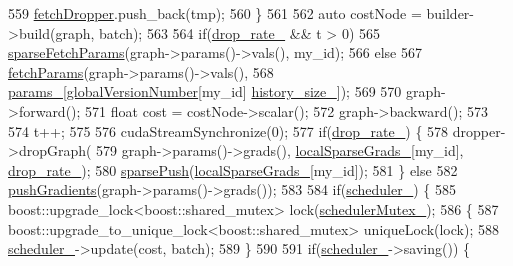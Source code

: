 \begin{DoxyCode}
559         \hyperlink{classmarian_1_1AsyncGraphGroup_a67f02023b00ba1a67e1f8894dbb7123a}{fetchDropper}.push\_back(tmp);
560       \}
561 
562       \textcolor{keyword}{auto} costNode = builder->build(graph, batch);
563 
564       \textcolor{keywordflow}{if}(\hyperlink{classmarian_1_1AsyncGraphGroup_a774969ba69bab8fbd48e6454bbe7e54c}{drop\_rate\_} && t > 0)
565         \hyperlink{classmarian_1_1AsyncGraphGroup_af104a4373fad7cc8f274423107c58d17}{sparseFetchParams}(graph->params()->vals(), my\_id);
566       \textcolor{keywordflow}{else}
567         \hyperlink{classmarian_1_1AsyncGraphGroup_aeec1695ae7d7ac0f819242ad0c8af55d}{fetchParams}(graph->params()->vals(),
568                     \hyperlink{classmarian_1_1AsyncGraphGroup_ad1bf15e55cc12b90d39012303b14767b}{params\_}[\hyperlink{classmarian_1_1AsyncGraphGroup_a75884703e6fe8efb3c75293eb912bce4}{globalVersionNumber}[my\_id] %
      \hyperlink{classmarian_1_1AsyncGraphGroup_a0958c1384fc7486dd4f739d69c9ac636}{history\_size\_}]);
569 
570       graph->forward();
571       \textcolor{keywordtype}{float} cost = costNode->scalar();
572       graph->backward();
573 
574       t++;
575 
576       cudaStreamSynchronize(0);
577       \textcolor{keywordflow}{if}(\hyperlink{classmarian_1_1AsyncGraphGroup_a774969ba69bab8fbd48e6454bbe7e54c}{drop\_rate\_}) \{
578         dropper->dropGraph(
579             graph->params()->grads(), \hyperlink{classmarian_1_1AsyncGraphGroup_a29422f1a8b9a8e2cc732101a34557b61}{localSparseGrads\_}[my\_id], 
      \hyperlink{classmarian_1_1AsyncGraphGroup_a774969ba69bab8fbd48e6454bbe7e54c}{drop\_rate\_});
580         \hyperlink{classmarian_1_1AsyncGraphGroup_a043878c3c7c2873ae802b5914b3cd73d}{sparsePush}(\hyperlink{classmarian_1_1AsyncGraphGroup_a29422f1a8b9a8e2cc732101a34557b61}{localSparseGrads\_}[my\_id]);
581       \} \textcolor{keywordflow}{else}
582         \hyperlink{classmarian_1_1AsyncGraphGroup_ae25b4b064f6c327fd957db0583ea7796}{pushGradients}(graph->params()->grads());
583 
584       \textcolor{keywordflow}{if}(\hyperlink{classmarian_1_1AsyncGraphGroup_a3847200bdb1e584e006457113f3aafd1}{scheduler\_}) \{
585         boost::upgrade\_lock<boost::shared\_mutex> lock(\hyperlink{classmarian_1_1AsyncGraphGroup_a0592c560087d3adae51f637a383e1511}{schedulerMutex\_});
586         \{
587           boost::upgrade\_to\_unique\_lock<boost::shared\_mutex> uniqueLock(lock);
588           \hyperlink{classmarian_1_1AsyncGraphGroup_a3847200bdb1e584e006457113f3aafd1}{scheduler\_}->update(cost, batch);
589         \}
590 
591         \textcolor{keywordflow}{if}(\hyperlink{classmarian_1_1AsyncGraphGroup_a3847200bdb1e584e006457113f3aafd1}{scheduler\_}->saving()) \{

\end{DoxyCode}
